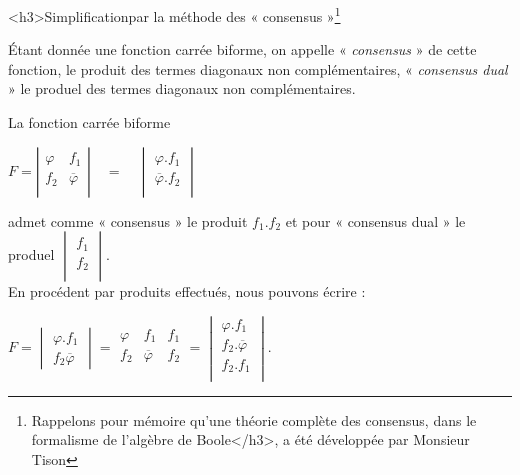 <h3>Simplificationpar la méthode des « consensus »\protect \footnote{Rappelons pour mémoire qu'une théorie complète des consensus, dans le formalisme de l'algèbre de {\sc Boole</h3>, a été développée par Monsieur Tison}}

Étant donnée une fonction carrée biforme, on appelle « \emph{consensus} » de cette fonction, le produit des termes diagonaux non complémentaires, « \emph{consensus dual} » le produel des termes diagonaux non complémentaires. 



La fonction carrée biforme 



  \centerline{$
   F =      \left| \begin{array}{c|c} 
                                     \varphi  & f_1 \\
                                      f_2 & \overline{\varphi} \\
                                \end{array} \right| 
                                    \quad = \quad 
                  \begin{vmatrix}  {\varphi} . f_1  \\
                                 \overline{ \varphi} . f_2   \\
               \end{vmatrix}
$}

admet comme « consensus » le produit $f_1 . f_2$ et pour « consensus dual » le produel  $\begin{vmatrix} f_1 \\f_2 \\ \end{vmatrix}$. \\ 
En procédent par produits effectués, nous pouvons écrire : 




\centerline{ $ F = \begin{vmatrix}
\varphi . f_1 \\ f_2 \overline{\varphi}
\end{vmatrix} 
       = \begin{array}{|c|c|c|} 
           \varphi & f_1 & f_1 \\
            f_2 & \overline{\varphi} & f_2 \\
           \end{array} 
             = \begin{vmatrix}
               \varphi . f_1 \\
               f_2 .   \overline{\varphi}  \\
               f_2 . f_1 \\           
             \end{vmatrix}
$.}





